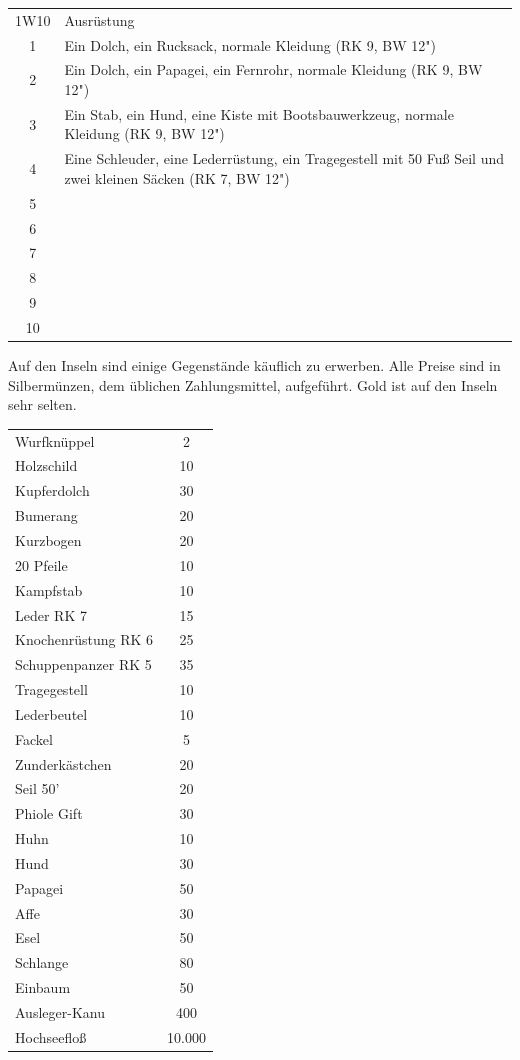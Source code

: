\documentclass[11pt]{wbzine}
\begin{document}
\begin{multicols}{2}
\begin{tabularx}{\columnwidth}{cZ}
    1W10 & Ausrüstung \\
    1 &
    Ein Dolch, ein Rucksack, normale Kleidung (RK 9, BW 12") \\
    2 &
    Ein Dolch, ein Papagei, ein Fernrohr, normale Kleidung (RK 9, BW
    12")\\
    3 & 
    Ein Stab, ein Hund, eine Kiste mit Bootsbauwerkzeug, normale
    Kleidung (RK 9, BW 12") \\
    4 & 
    Eine Schleuder, eine Lederrüstung, ein Tragegestell mit 50 Fuß
    Seil und zwei kleinen Säcken (RK 7, BW 12") \\
    5 &
    \\
6 &
\\

7 &
\\

8 &
\\

9 &
\\

10 &
\\

\end{tabularx}

Auf den Inseln sind einige Gegenstände käuflich zu erwerben. 
Alle Preise sind in Silbermünzen, dem üblichen Zahlungsmittel,
aufgeführt. Gold ist auf den Inseln sehr selten.

\begin{tabularx}{\columnwidth}{Zc}
    Wurfknüppel & 2\\
    Holzschild     & 10\\
    Kupferdolch     &30\\
    Bumerang        &20\\
    Kurzbogen       &20\\
    20 Pfeile       &10\\
    Kampfstab       &10\\
    Leder RK 7           &   15\\
    Knochenrüstung RK 6            &25\\
    Schuppenpanzer RK 5     &35\\
    Tragegestell    &10\\
    Lederbeutel     &10\\
    Fackel         & 5\\
    Zunderkästchen  &20\\
    Seil 50'        &20\\
    Phiole Gift     &30\\
    Huhn         &10\\
    Hund            & 30\\
    Papagei          &50\\
    Affe          &30\\
    Esel          &50\\
    Schlange         &  80\\
    Einbaum         &50\\
    Ausleger-Kanu   &400\\
    Hochseefloß      &10.000\\
\end{tabularx}


\end{multicols}
\end{document}
